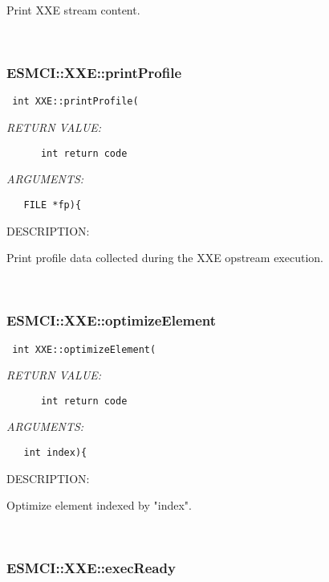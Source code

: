     Print XXE stream content. 
 
\mbox{}\hrulefill\
 
\subsubsection [ESMCI::XXE::printProfile] {ESMCI::XXE::printProfile}


  
\begin{verbatim} int XXE::printProfile(\end{verbatim}{\em RETURN VALUE:}
\begin{verbatim}      int return code\end{verbatim}{\em ARGUMENTS:}
\begin{verbatim}   FILE *fp){\end{verbatim}
{\sf DESCRIPTION:\\ }


    Print profile data collected during the XXE opstream execution. 
 
\mbox{}\hrulefill\
 
\subsubsection [ESMCI::XXE::optimizeElement] {ESMCI::XXE::optimizeElement}


  
\begin{verbatim} int XXE::optimizeElement(\end{verbatim}{\em RETURN VALUE:}
\begin{verbatim}      int return code\end{verbatim}{\em ARGUMENTS:}
\begin{verbatim}   int index){\end{verbatim}
{\sf DESCRIPTION:\\ }


    Optimize element indexed by "index". 
 
\mbox{}\hrulefill\
 
\subsubsection [ESMCI::XXE::execReady] {ESMCI::XXE::execReady}


